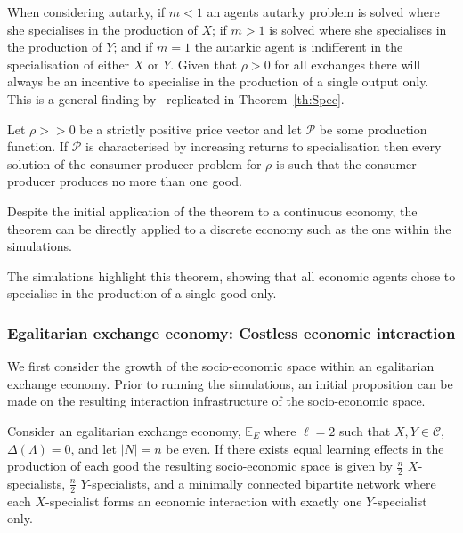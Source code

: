 When considering autarky, if $m<1$ an agents autarky problem is solved where she specialises in the production of $X$; if $m>1$ is solved where she specialises in the production of $Y$; and if $m=1$ the autarkic agent is indifferent in the specialisation of either $X$ or $Y$. Given that $\rho>0$ for all exchanges there will always be an incentive to specialise in the production of a single output only. This is a general finding by~\citet{Gilles2016} replicated in Theorem~\ref{th:Spec}. 

\begin{theorem} \label{th:Spec}
Let $\rho >> 0$ be a strictly positive price vector and let $\mathcal{P}$ be some production function. If $\mathcal{P}$ is characterised by increasing returns to specialisation then every solution of the consumer-producer problem for $\rho$ is such that the consumer-producer produces no more than one good.
\end{theorem}

Despite the initial application of the theorem to a continuous economy, the theorem can be directly applied to a discrete economy such as the one within the simulations.

The simulations highlight this theorem, showing that all economic agents chose to specialise in the production of a single good only.

\subsubsection{Egalitarian exchange economy: Costless economic interaction}

We first consider the growth of the socio-economic space within an egalitarian exchange economy. Prior to running the simulations, an initial proposition can be made on the resulting interaction infrastructure of the socio-economic space.

\begin{proposition} \label{prop:costlesseec}
Consider an egalitarian exchange economy, $\mathbb{E}_{E}$ where $\ell = 2$ such that $X,Y \in \mathcal{C}$,  $\Delta(\Lambda) = 0$, and let $|N|=n$ be even. If there exists equal learning effects in the production of each good the resulting socio-economic space is given by $\frac{n}{2}$ $X$-specialists, $\frac{n}{2}$ $Y$-specialists, and a minimally connected bipartite network where each $X$-specialist forms an economic interaction with exactly one $Y$-specialist only.
\end{proposition}

